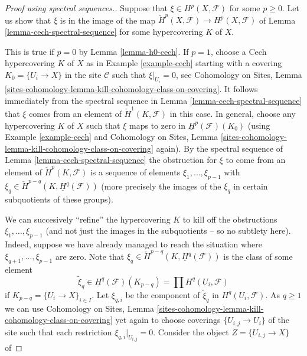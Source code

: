 \begin{proof}[Proof using spectral sequences.]
Suppose that $\xi \in H^p(X, \mathcal{F})$ for some $p \geq 0$.
Let us show that $\xi$ is in the image of the map
$\check{H}^p(X, \mathcal{F}) \to H^p(X, \mathcal{F})$ of
Lemma \ref{lemma-cech-spectral-sequence}
for some hypercovering $K$ of $X$.

\medskip\noindent
This is true if $p = 0$ by Lemma \ref{lemma-h0-cech}.
If $p = 1$, choose a Cech hypercovering $K$ of $X$ as in
Example \ref{example-cech} starting with a covering
$K_0 = \{U_i \to X\}$ in the site $\mathcal{C}$ such that
$\xi|_{U_i} = 0$, see
Cohomology on Sites,
Lemma \ref{sites-cohomology-lemma-kill-cohomology-class-on-covering}.
It follows immediately from the spectral sequence
in Lemma \ref{lemma-cech-spectral-sequence} that $\xi$ comes
from an element of $\check{H}^1(K, \mathcal{F})$ in this case.
In general, choose any hypercovering $K$ of $X$ such
that $\xi$ maps to zero in $\underline{H}^p(\mathcal{F})(K_0)$
(using Example \ref{example-cech} and
Cohomology on Sites,
Lemma \ref{sites-cohomology-lemma-kill-cohomology-class-on-covering}
again).
By the spectral sequence of Lemma \ref{lemma-cech-spectral-sequence}
the obstruction for $\xi$ to come from an element of
$\check{H}^p(K, \mathcal{F})$ is a sequence of elements
$\xi_1, \ldots, \xi_{p - 1}$ with
$\xi_q \in \check{H}^{p - q}(K, \underline{H}^q(\mathcal{F}))$
(more precisely the images of the $\xi_q$ in certain subquotients
of these groups).

\medskip\noindent
We can succesively ``refine'' the hypercovering $K$ to kill off the
obstructions $\xi_1, \ldots, \xi_{p - 1}$ (and not just the images
in the subquotients -- so no subtlety here). Indeed, suppose we have
already managed to reach the situation where
$\xi_{q + 1}, \ldots, \xi_{p - 1}$ are zero.
Note that $\xi_q \in \check{H}^{p - q}(K, \underline{H}^q(\mathcal{F}))$
is the class of some element
$$
\tilde \xi_q \in
\underline{H}^q(\mathcal{F})(K_{p - q}) =
\prod H^q(U_i, \mathcal{F})
$$
if $K_{p - q} = \{U_i \to X\}_{i \in I}$. Let $\xi_{q, i}$
be the component of $\tilde \xi_q$ in $H^q(U_i, \mathcal{F})$.
As $q \geq 1$ we can use
Cohomology on Sites,
Lemma \ref{sites-cohomology-lemma-kill-cohomology-class-on-covering}
yet again to choose coverings $\{U_{i, j} \to U_i\}$
of the site such that each restriction $\xi_{q, i}|_{U_{i, j}} = 0$.
Consider the object $Z = \{U_{i, j} \to X\}$ of


\end{proof}



